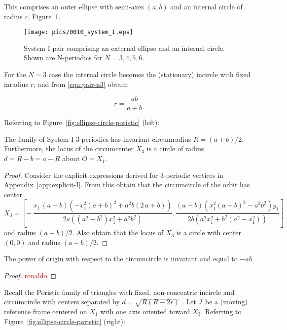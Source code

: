 This comprises an outer ellipse with semi-axes $(a,b)$ and an internal circle of radius $r$, Figure~\ref{fig:inner-circle}.

\begin{figure}
    \centering
\texttt{[image: pics/0010\_system\_I.eps]}
    \caption{System I pair comprising an external ellipse and an internal circle. Shown are N-periodics for $N=3,4,5,6$.}
    \label{fig:inner-circle}
\end{figure}

For the $N=3$ case the internal circle becomes the (stationary) incircle with fixed inradius $r$, and from \eqref{eqn:pair-n3} obtain:

\[ r=\frac{{a}{b}}{a+b}\]

\noindent Referring to Figure~\ref{fig:ellipse-circle-poristic} (left):

\begin{proposition}
The family of System I 3-periodics has invariant circumradius $R=(a+b)/2$. Furthermore, the locus of the circumcenter $X_3$ is a circle of radius $d=R-b=a-R$ about $O=X_1$.
\label{prop:R}
\end{proposition}

\begin{proof}
Consider the explicit expressions derived for 3-periodic vertices in Appendix~\ref{app:explicit-I}. From this obtain that the circumcircle of the orbit has center 
	\[X_3=\left[ - \,{\frac {x_1\, \left( a-b \right)  \left( -x_1^{2}
			\left( a+b \right) ^{2}+{a}^{2}b \left( 2\,a+b \right)  \right) }{2a
			\left(  \left( {a}^{2}-{b}^{2} \right) x_1^{2}+{a}^{2}{b}^{2}
			\right) }}
	 ,  {\frac { \left( a-b \right)  \left( x_1^{2} \left( a+b
	 		\right) ^{2}-{a}^{2}{b}^{2} \right) y_1}{2b \left( {a}^{2}x_1^2+{b}^{2} \left( {a}^{2}-x_1^{2} \right)  \right) }}
	   \right]\]
	and radius $(a+b)/2$. Also obtain that the locus of $X_3$ is a circle with center $(0,0)$ and radius $(a-b)/2$.
	

\end{proof}
\begin{proposition} The power of origin with respect to the circumcircle is invariant and  equal to $-ab$
	
	
\end{proposition}


\begin{proof}
	\textcolor{red}{ronaldo}
	
\end{proof}

Recall the Poristic family of triangles with fixed, non-concentric incircle and circumcircle with centers separated by $d=\sqrt{R(R-2r)}$  \cite{gallatly1914-geometry,odehnal2011-poristic}. Let $\mathcal{I}$ be a (moving) reference frame centered on $X_1$ with one axis oriented toward $X_3$. Referring to Figure~\ref{fig:ellipse-circle-poristic} (right):


